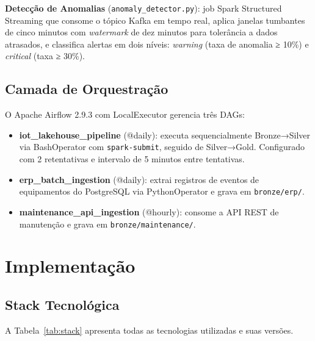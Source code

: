 \textbf{Detecção de Anomalias} (\texttt{anomaly\_detector.py}): job Spark Structured
Streaming que consome o tópico Kafka em tempo real, aplica janelas tumbantes de cinco
minutos com \textit{watermark} de dez minutos para tolerância a dados atrasados, e
classifica alertas em dois níveis: \textit{warning} (taxa de anomalia ≥ 10\%) e
\textit{critical} (taxa ≥ 30\%).

\subsection{Camada de Orquestração}

O Apache Airflow 2.9.3 com LocalExecutor gerencia três DAGs:

\begin{itemize}
    \item \textbf{iot\_lakehouse\_pipeline} (@daily): executa sequencialmente
    Bronze→Silver via BashOperator com \texttt{spark-submit}, seguido de Silver→Gold.
    Configurado com 2 retentativas e intervalo de 5 minutos entre tentativas.

    \item \textbf{erp\_batch\_ingestion} (@daily): extrai registros de eventos de
    equipamentos do PostgreSQL via PythonOperator e grava em \texttt{bronze/erp/}.

    \item \textbf{maintenance\_api\_ingestion} (@hourly): consome a API REST de
    manutenção e grava em \texttt{bronze/maintenance/}.
\end{itemize}

\section{Implementação}

\subsection{Stack Tecnológica}

A Tabela~\ref{tab:stack} apresenta todas as tecnologias utilizadas e suas versões.

